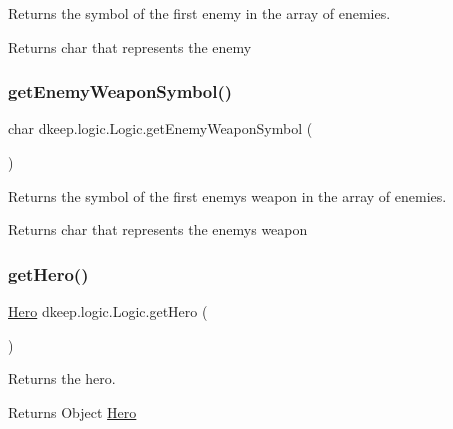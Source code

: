 Returns the symbol of the first enemy in the array of enemies. \begin{DoxyReturn}{Returns}
char that represents the enemy 
\end{DoxyReturn}
\mbox{\label{classdkeep_1_1logic_1_1_logic_a73d73f30185c2a55b7bc9d3e743dc6bf}} 
\subsubsection{\texorpdfstring{get\+Enemy\+Weapon\+Symbol()}{getEnemyWeaponSymbol()}}
{\footnotesize\ttfamily char dkeep.\+logic.\+Logic.\+get\+Enemy\+Weapon\+Symbol (\begin{DoxyParamCaption}{ }\end{DoxyParamCaption})}

Returns the symbol of the first enemy\textquotesingle{}s weapon in the array of enemies. \begin{DoxyReturn}{Returns}
char that represents the enemy\textquotesingle{}s weapon 
\end{DoxyReturn}
\mbox{\label{classdkeep_1_1logic_1_1_logic_a69dc81092b0395e64b0f09e6c39a355a}} 
\subsubsection{\texorpdfstring{get\+Hero()}{getHero()}}
{\footnotesize\ttfamily \hyperlink{classdkeep_1_1logic_1_1_hero}{Hero} dkeep.\+logic.\+Logic.\+get\+Hero (\begin{DoxyParamCaption}{ }\end{DoxyParamCaption})}

Returns the hero. \begin{DoxyReturn}{Returns}
Object \hyperlink{classdkeep_1_1logic_1_1_hero}{Hero} 
\end{DoxyReturn}
\mbox{\label{classdkeep_1_1logic_1_1_logic_a83397013032b9ff9b023b52d54e2a839}} 
